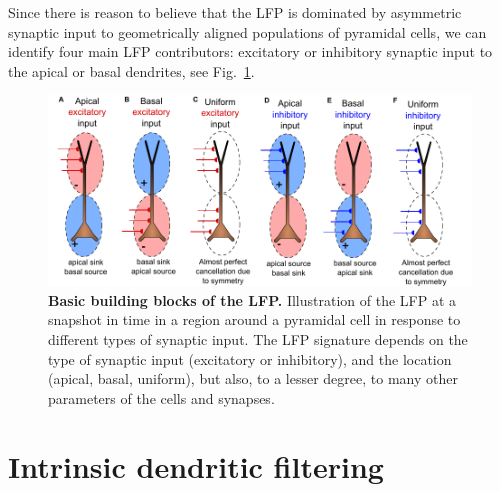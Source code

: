Since there is reason to believe that the LFP is dominated by asymmetric synaptic input to geometrically aligned populations of pyramidal cells, we can identify four main LFP contributors: excitatory or inhibitory synaptic input to the apical or basal dendrites, see Fig.~\ref{LFP:fig:LFP_lego}.

\begin{figure}[!ht]
\begin{center}
\includegraphics[width=.7\textwidth]{Figures/LFP/dipole_basics.pdf}
\end{center}
\caption{\textbf{Basic building blocks of the LFP.}
Illustration of the LFP at a snapshot in time in a region around a pyramidal
cell in response to different types of synaptic input. The LFP signature depends on the type of synaptic input (excitatory
or inhibitory), and the location (apical, basal, uniform), but also, to a lesser degree, to many other parameters of the cells
and synapses.
}
\label{LFP:fig:LFP_lego}
\end{figure}


\section{Intrinsic dendritic filtering}

